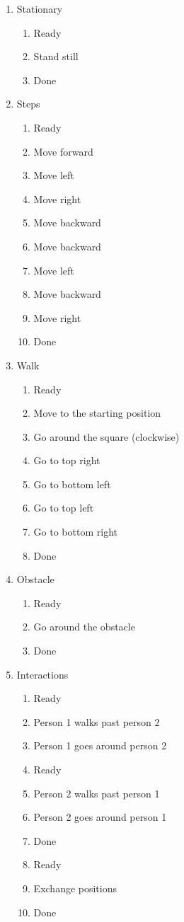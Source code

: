 \begin{enumerate}
  \item Stationary
    \begin{enumerate}
      \item Ready
      \item Stand still
      \item Done
    \end{enumerate}
  \item Steps
    \begin{enumerate}
      \item Ready
      \item Move forward
      \item Move left
      \item Move right
      \item Move backward
      \item Move backward
      \item Move left
      \item Move backward
      \item Move right
      \item Done
    \end{enumerate}
  \item Walk
    \begin{enumerate}
      \item Ready
      \item Move to the starting position
      \item Go around the square (clockwise)
      \item Go to top right
      \item Go to bottom left
      \item Go to top left
      \item Go to bottom right
      \item Done
    \end{enumerate}
  \item Obstacle
    \begin{enumerate}
      \item Ready
      \item Go around the obstacle
      \item Done
    \end{enumerate}
  \item Interactions
    \begin{enumerate}
      \item Ready
      \item Person 1 walks past person 2
      \item Person 1 goes around person 2
      \item Ready
      \item Person 2 walks past person 1
      \item Person 2 goes around person 1
      \item Done
      \item Ready
      \item Exchange positions
      \item Done
    \end{enumerate}
\end{enumerate}


